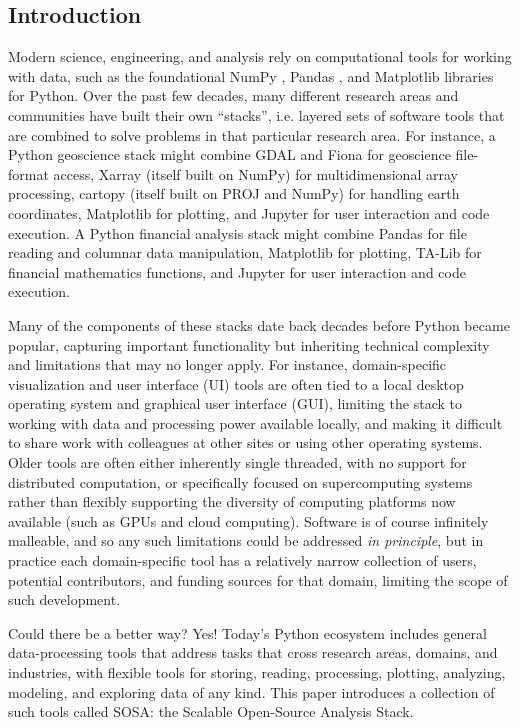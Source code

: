 \subsection{Introduction \label{introduction}}

Modern science, engineering, and analysis rely on computational tools for working with data, such as the foundational NumPy \cite{harris:nature20}, Pandas \cite{mckinney:scipy10}, and Matplotlib \cite{hunter:cse07} libraries for Python. Over the past few decades, many different research areas and communities have built their own ``stacks'', i.e. layered sets of software tools that are combined to solve problems in that particular research area. For instance, a Python geoscience stack might combine GDAL and Fiona for geoscience file-format access, Xarray (itself built on NumPy) for multidimensional array processing, cartopy (itself built on PROJ and NumPy) for handling earth coordinates, Matplotlib for plotting, and Jupyter for user interaction and code execution. A Python financial analysis stack might combine Pandas for file reading and columnar data manipulation, Matplotlib for plotting, TA-Lib for financial mathematics functions, and Jupyter for user interaction and code execution.

Many of the components of these stacks date back decades before Python became popular, capturing important functionality but inheriting technical complexity and limitations that may no longer apply. For instance, domain-specific visualization and user interface (UI) tools are often tied to a local desktop operating system and graphical user interface (GUI), limiting the stack to working with data and processing power available locally, and making it difficult to share work with colleagues at other sites or using other operating systems. Older tools are often either inherently single threaded, with no support for distributed computation, or specifically focused on supercomputing systems rather than flexibly supporting the diversity of computing platforms now available (such as GPUs and cloud computing). Software is of course infinitely malleable, and so any such limitations could be addressed \emph{in principle}, but in practice each domain-specific tool has a relatively narrow collection of users, potential contributors, and funding sources for that domain, limiting the scope of such development.

Could there be a better way? Yes! Today's Python ecosystem includes general data-processing tools that address tasks that cross research areas, domains, and industries, with flexible tools for storing, reading, processing, plotting, analyzing, modeling, and exploring data of any kind. This paper introduces a collection of such tools called SOSA: the Scalable Open-Source Analysis Stack.

